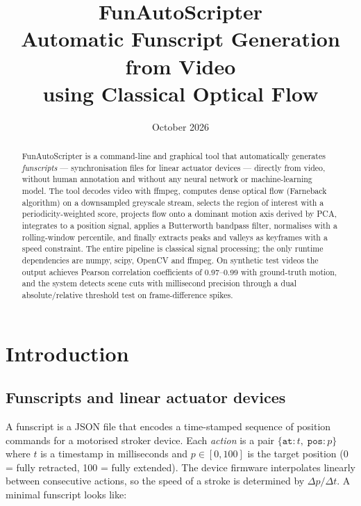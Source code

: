 \documentclass[12pt,a4paper]{article}
\title{\textbf{FunAutoScripter}\\[0.4em]
  \large Automatic Funscript Generation from Video\\
  using Classical Optical Flow}
\author{}
\date{October 2026}
\begin{document}
\maketitle
\thispagestyle{empty}

\begin{abstract}
FunAutoScripter is a command-line and graphical tool that automatically
generates \emph{funscripts} --- synchronisation files for linear actuator
devices --- directly from video, without human annotation and without any
neural network or machine-learning model. The tool decodes video with ffmpeg,
computes dense optical flow (Farneback algorithm) on a downsampled greyscale
stream, selects the region of interest with a periodicity-weighted score,
projects flow onto a dominant motion axis derived by PCA, integrates to a
position signal, applies a Butterworth bandpass filter, normalises with a
rolling-window percentile, and finally extracts peaks and valleys as keyframes
with a speed constraint. The entire pipeline is classical signal processing;
the only runtime dependencies are numpy, scipy, OpenCV and ffmpeg. On synthetic
test videos the output achieves Pearson correlation coefficients of 0.97--0.99
with ground-truth motion, and the system detects scene cuts with millisecond
precision through a dual absolute/relative threshold test on frame-difference
spikes.
\end{abstract}

\tableofcontents
\clearpage

\section{Introduction}
\label{sec:intro}

\subsection{Funscripts and linear actuator devices}

A funscript is a JSON file that encodes a time-stamped sequence of position
commands for a motorised stroker device. Each \emph{action} is a pair
\(\{\texttt{at}: t,\; \texttt{pos}: p\}\) where \(t\) is a timestamp in
milliseconds and \(p \in [0, 100]\) is the target position (0 = fully
retracted, 100 = fully extended). The device firmware interpolates linearly
between consecutive actions, so the speed of a stroke is determined by
\(\Delta p / \Delta t\). A minimal funscript looks like:
\end{document}
